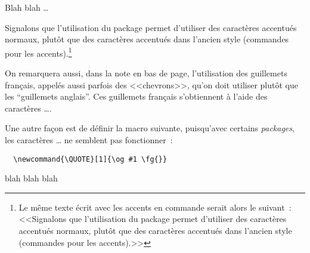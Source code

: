 \begin{introduction}


\label{introduction.chap}

Blah blah \ldots

Signalons que l'utilisation du package  permet d'utiliser
des caractères accentués normaux, plutôt que des caractères accentués
dans l'ancien style (commandes pour les accents).\footnote{Le même
texte écrit avec les accents en commande serait alors le suivant~:
<<Signalons que l'utilisation du package  permet
d'utiliser des caract\`eres accentu\'es normaux, plut\^ot que des
caract\`eres accentu\'es dans l'ancien style (commandes pour les
accents).>>}

On remarquera aussi, dans la note en bas de page, l'utilisation des
guillemets français, appelés aussi parfois des <<chevrons>>, qu'on
doit utiliser plutôt que les ``guillemets anglais''.  Ces guillemets
français s'obtiennent à l'aide des caractères
\TT{<}\TT{<}\ldots\TT{>}\TT{>}.

Une autre façon est de définir la macro suivante, puisqu'avec certains
\emph{packages}, les caract\`eres \TT{<}\TT{<}\ldots\TT{>}\TT{>} ne
semblent pas fonctionner~:
{\small
\begin{verbatim}
  \newcommand{\QUOTE}[1]{\og #1 \fg{}}
\end{verbatim}
} 


\newpage

blah blah blah

\end{introduction}
